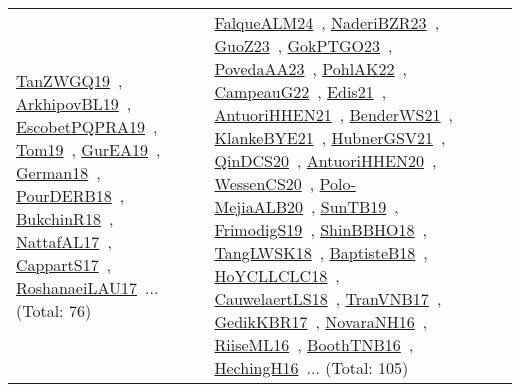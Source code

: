 {\begin{longtable}{lp{3cm}>{\raggedright\arraybackslash}p{6cm}>{\raggedright\arraybackslash}p{6cm}>{\raggedright\arraybackslash}p{8cm}}
\href{../works/TanZWGQ19.pdf}{TanZWGQ19}~\cite{TanZWGQ19}, \href{../works/ArkhipovBL19.pdf}{ArkhipovBL19}~\cite{ArkhipovBL19}, \href{../works/EscobetPQPRA19.pdf}{EscobetPQPRA19}~\cite{EscobetPQPRA19}, \href{../works/Tom19.pdf}{Tom19}~\cite{Tom19}, \href{../works/GurEA19.pdf}{GurEA19}~\cite{GurEA19}, \href{../works/German18.pdf}{German18}~\cite{German18}, \href{../works/PourDERB18.pdf}{PourDERB18}~\cite{PourDERB18}, \href{../works/BukchinR18.pdf}{BukchinR18}~\cite{BukchinR18}, \href{../works/NattafAL17.pdf}{NattafAL17}~\cite{NattafAL17}, \href{../works/CappartS17.pdf}{CappartS17}~\cite{CappartS17}, \href{../works/RoshanaeiLAU17.pdf}{RoshanaeiLAU17}~\cite{RoshanaeiLAU17}... (Total: 76) & \href{../works/FalqueALM24.pdf}{FalqueALM24}~\cite{FalqueALM24}, \href{../works/NaderiBZR23.pdf}{NaderiBZR23}~\cite{NaderiBZR23}, \href{../works/GuoZ23.pdf}{GuoZ23}~\cite{GuoZ23}, \href{../works/GokPTGO23.pdf}{GokPTGO23}~\cite{GokPTGO23}, \href{../works/PovedaAA23.pdf}{PovedaAA23}~\cite{PovedaAA23}, \href{../works/PohlAK22.pdf}{PohlAK22}~\cite{PohlAK22}, \href{../works/CampeauG22.pdf}{CampeauG22}~\cite{CampeauG22}, \href{../works/Edis21.pdf}{Edis21}~\cite{Edis21}, \href{../works/AntuoriHHEN21.pdf}{AntuoriHHEN21}~\cite{AntuoriHHEN21}, \href{../works/BenderWS21.pdf}{BenderWS21}~\cite{BenderWS21}, \href{../works/KlankeBYE21.pdf}{KlankeBYE21}~\cite{KlankeBYE21}, \href{../works/HubnerGSV21.pdf}{HubnerGSV21}~\cite{HubnerGSV21}, \href{../works/QinDCS20.pdf}{QinDCS20}~\cite{QinDCS20}, \href{../works/AntuoriHHEN20.pdf}{AntuoriHHEN20}~\cite{AntuoriHHEN20}, \href{../works/WessenCS20.pdf}{WessenCS20}~\cite{WessenCS20}, \href{../works/Polo-MejiaALB20.pdf}{Polo-MejiaALB20}~\cite{Polo-MejiaALB20}, \href{../works/SunTB19.pdf}{SunTB19}~\cite{SunTB19}, \href{../works/FrimodigS19.pdf}{FrimodigS19}~\cite{FrimodigS19}, \href{../works/ShinBBHO18.pdf}{ShinBBHO18}~\cite{ShinBBHO18}, \href{../works/TangLWSK18.pdf}{TangLWSK18}~\cite{TangLWSK18}, \href{../works/BaptisteB18.pdf}{BaptisteB18}~\cite{BaptisteB18}, \href{../works/HoYCLLCLC18.pdf}{HoYCLLCLC18}~\cite{HoYCLLCLC18}, \href{../works/CauwelaertLS18.pdf}{CauwelaertLS18}~\cite{CauwelaertLS18}, \href{../works/TranVNB17.pdf}{TranVNB17}~\cite{TranVNB17}, \href{../works/GedikKBR17.pdf}{GedikKBR17}~\cite{GedikKBR17}, \href{../works/NovaraNH16.pdf}{NovaraNH16}~\cite{NovaraNH16}, \href{../works/RiiseML16.pdf}{RiiseML16}~\cite{RiiseML16}, \href{../works/BoothTNB16.pdf}{BoothTNB16}~\cite{BoothTNB16}, \href{../works/HechingH16.pdf}{HechingH16}~\cite{HechingH16}... (Total: 105)\\

\end{longtable}}
